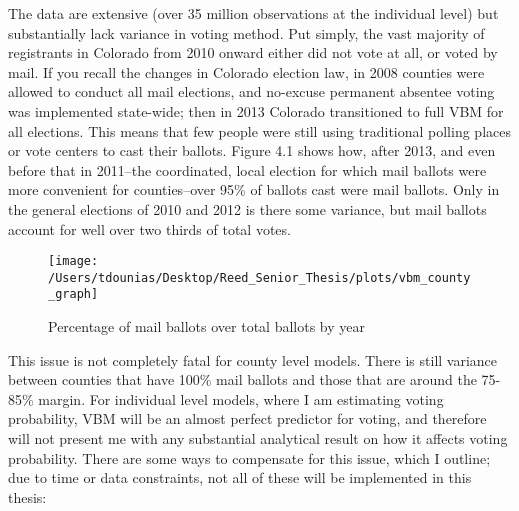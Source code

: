 \documentclass[]{article}
\begin{document}
The data are extensive (over 35 million observations at the individual
level) but substantially lack variance in voting method. Put simply, the
vast majority of registrants in Colorado from 2010 onward either did not
vote at all, or voted by mail. If you recall the changes in Colorado
election law, in 2008 counties were allowed to conduct all mail
elections, and no-excuse permanent absentee voting was implemented
state-wide; then in 2013 Colorado transitioned to full VBM for all
elections. This means that few people were still using traditional
polling places or vote centers to cast their ballots. Figure 4.1 shows
how, after 2013, and even before that in 2011--the coordinated, local
election for which mail ballots were more convenient for counties--over
95\% of ballots cast were mail ballots. Only in the general elections of
2010 and 2012 is there some variance, but mail ballots account for well
over two thirds of total votes.

\begin{figure}

{\centering \texttt{[image: /Users/tdounias/Desktop/Reed\_Senior\_Thesis/plots/vbm\_county\_graph]} 

}

\caption{Percentage of mail ballots over total ballots by year}\label{fig:vbm png}
\end{figure}

This issue is not completely fatal for county level models. There is
still variance between counties that have 100\% mail ballots and those
that are around the 75-85\% margin. For individual level models, where I
am estimating voting probability, VBM will be an almost perfect
predictor for voting, and therefore will not present me with any
substantial analytical result on how it affects voting probability.
There are some ways to compensate for this issue, which I outline; due
to time or data constraints, not all of these will be implemented in
this thesis:
\end{document}

